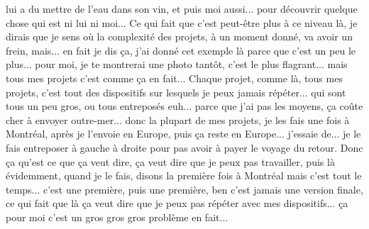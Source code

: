 lui a du mettre de l'eau dans son vin, et puis moi aussi... pour découvrir quelque chose qui est ni lui ni moi... Ce qui fait que c'est peut-être plus à ce niveau là, je dirais que je sens où la complexité des projets, à un moment donné, va avoir un frein, mais... en fait je dis ça, j'ai donné cet exemple là parce que c'est un peu le plus... pour moi, je te montrerai une photo tantôt, c'est le plus flagrant... mais tous mes projets c'est comme ça en fait... Chaque projet, comme là, tous mes projets, c'est tout des dispositifs sur lesquels je peux jamais répéter... qui sont tous un peu gros, ou tous entreposés euh... parce que j'ai pas les moyens, ça coûte cher à envoyer outre-mer...  donc la plupart de mes projets, je les fais une fois à Montréal, après je l'envoie en Europe, puis ça reste en Europe... j'essaie de... je le fais entreposer à gauche à droite pour pas avoir à payer le voyage du retour. Donc ça qu'est ce que ça veut dire, ça veut dire que je peux pas travailler, puis là évidemment, quand je le fais, disons la première fois à Montréal mais c'est tout le temps... c'est une première, puis une première, ben c'est jamais une version finale, ce qui fait que là ça veut dire que je peux pas répéter avec mes dispositifs... ça pour moi c'est un gros gros gros problème en fait... 


